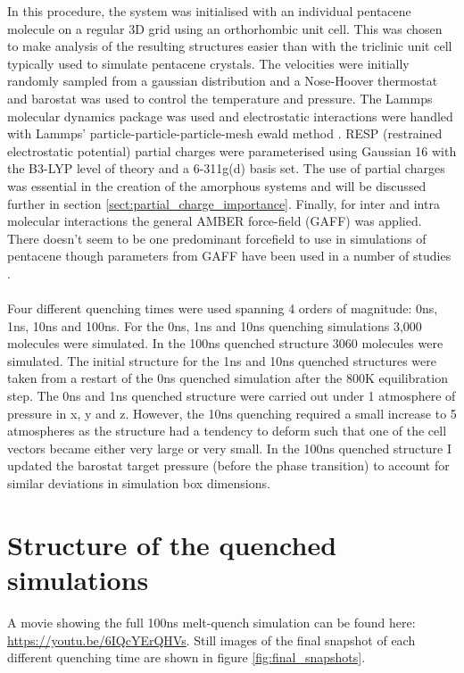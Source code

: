 \noindent In this procedure, the system was initialised with an individual pentacene molecule on a regular 3D grid using an orthorhombic unit cell. This was chosen to make analysis of the resulting structures easier than with the triclinic unit cell typically used to simulate pentacene crystals. The velocities were initially randomly sampled from a gaussian distribution and a Nose-Hoover thermostat and barostat was used to control the temperature and pressure. The Lammps molecular dynamics package was used \cite{LammpsMain, LammpsURL} and electrostatic interactions were handled with Lammps' particle-particle-particle-mesh ewald method \cite{LammpsPPPME}. RESP \cite{RESP} (restrained electrostatic potential) partial charges were parameterised using Gaussian 16 \cite{g16} with the B3-LYP level of theory and a 6-311g(d) basis set. The use of partial charges was essential in the creation of the amorphous systems and will be discussed further in section \ref{sect:partial_charge_importance}. Finally, for inter and intra molecular interactions the general AMBER force-field \cite{GAFF} (GAFF) was applied. There doesn't seem to be one predominant forcefield to use in simulations of pentacene though parameters from GAFF have been used in a number of studies \cite{C0JM01577F, Yoneya2012, PentCrystallisation, MILLER201728, Wang2011, C6CP06436A, doi:10.1246/cl.180450}.
\\\\
Four different quenching times were used spanning 4 orders of magnitude: 0ns, 1ns, 10ns and 100ns. For the 0ns, 1ns and 10ns quenching simulations 3,000 molecules were simulated. In the 100ns quenched structure 3060 molecules were simulated. The initial structure for the 1ns and 10ns quenched structures were taken from a restart of the 0ns quenched simulation after the 800K equilibration step. The 0ns and 1ns quenched structure were carried out under 1 atmosphere of pressure in x, y and z. However, the 10ns quenching required a small increase to 5 atmospheres as the structure had a tendency to deform such that one of the cell vectors became either very large or very small. In the 100ns quenched structure I updated the barostat target pressure (before the phase transition) to account for similar deviations in simulation box dimensions.
\section{Structure of the quenched simulations}
A movie showing the full 100ns melt-quench simulation can be found here: \href{https://youtu.be/6IQcYErQHVs}{https://youtu.be/6IQcYErQHVs}. Still images of the final snapshot of each different quenching time are shown in figure \ref{fig:final_snapshots}.
